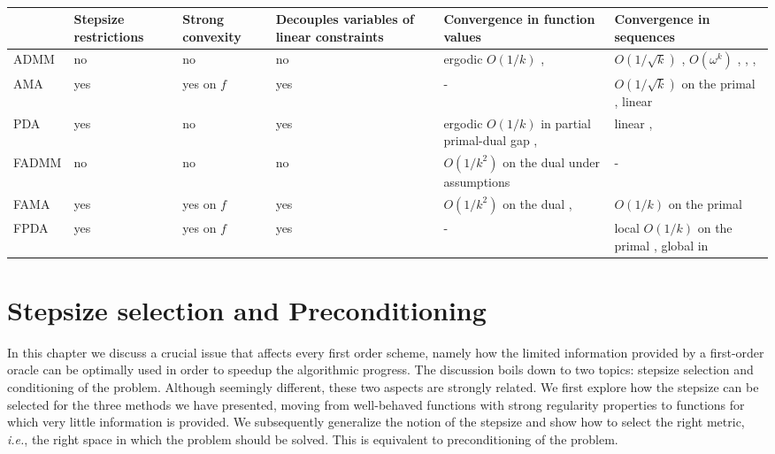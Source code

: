 \documentclass[openany]{now}
\newcommand{\ie}{{\it i.e.}}
\begin{document}
\begin{center}
\begin{table}[!ht]
  \centering
    \begin{tabular}{ | l | p{1.5cm} | p{1.5cm} | p{2cm} || p{2.8cm} | p{2.8cm} |}
    \hline
     & Stepsize restrictions & Strong convexity & Decouples variables of linear constraints & Convergence in function values & Convergence in sequences \\ \hline
     ADMM & no & no & no & ergodic $O(1/k)$ \cite{HeY12}, \cite{shefi2014rate} & $O(1/\sqrt{k})$ \cite{shefi2014rate}, $O(\omega^k)$ \cite{deng2012global}, \cite{linear_multi_admm}, \cite{ghadimi2013optimal}, \cite{nishihara2015general} \\ \hline
     AMA & yes & yes on $f$ & yes & - & $O(1/\sqrt{k})$ on the primal \cite{beck2014fast}, linear\\ \hline
     PDA & yes & no & yes & ergodic $O(1/k)$ in partial primal-dual gap \cite[Theorem~1]{chamb}, \cite{pda_vu} & linear \cite[Theorem~3]{chamb},\cite[Theorem~24]{bot2013convergence}  \\ \hline
     FADMM & no & no & no & $O(1/k^2)$ on the dual under assumptions& -\\ \hline
     FAMA & yes & yes on $f$& yes &$O(1/k^2)$ on the dual \cite{goldstein2014fast}, \cite{beck2014fast} & $O(1/k)$ on the primal \cite{beck2014fast}\\ \hline
     FPDA & yes & yes on $f$ & yes & - & local $O(1/k)$ on the primal \cite[Theorem~2]{chamb}, global in~\cite[Theorem~19]{bot2013convergence}\\ \hline
    \end{tabular}
    \caption{}
    {\label{table:convergence_properties}}
\end{table}
\end{center}



\chapter{Stepsize selection and Preconditioning}{\label{ch:speedup}}
In this chapter we discuss a crucial issue that affects every first order scheme, namely how the limited information provided by a first-order oracle can be optimally used in order to speedup the algorithmic progress. The discussion boils down to two topics: stepsize selection and conditioning of the problem. Although seemingly different, these two aspects are strongly related. We first explore how the stepsize can be selected for the three methods we have presented, moving from well-behaved functions with strong regularity properties to functions for which very little information is provided. We subsequently generalize the notion of the stepsize and show how to select the right metric, \ie, the right space in which the problem should be solved. This is equivalent to preconditioning of the problem.
\end{document}
